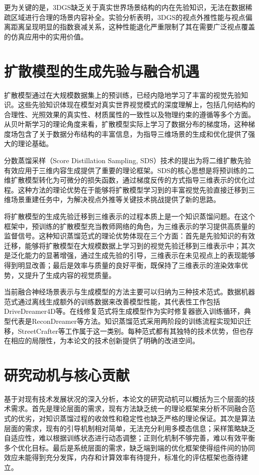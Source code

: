 更为关键的是，3DGS缺乏关于真实世界场景结构的内在先验知识，无法在数据稀疏区域进行合理的场景内容补全。实验分析表明，3DGS的视点外推性能与视点偏离距离呈现明显的指数衰减关系，这种性能退化严重限制了其在需要广泛视点覆盖的仿真应用中的实用价值。

\section{扩散模型的生成先验与融合机遇}

扩散模型通过在大规模数据集上的预训练，已经内隐地学习了丰富的视觉先验知识\cite{ho2020denoising}。这些先验知识体现在模型对真实世界视觉模式的深度理解上，包括几何结构的合理性、光照效果的真实性、材质属性的一致性以及物理约束的遵循等多个方面。从贝叶斯学习的理论角度来看，扩散模型实际上学习了数据分布的梯度场，这种梯度场包含了关于数据分布结构的丰富信息，为指导三维场景的生成和优化提供了强大的理论基础。

分数蒸馏采样（Score Distillation Sampling, SDS）技术的提出为将二维扩散先验有效应用于三维内容生成提供了重要的理论框架\cite{dreamfusion2022}。SDS的核心思想是将预训练的二维扩散模型转化为可微分的损失函数，通过梯度反传的方式指导三维表示的优化过程。这种方法的理论优势在于能够将扩散模型学习到的丰富视觉先验直接迁移到三维场景重建任务中，为解决视点外推等关键技术挑战提供了新的思路。

将扩散模型的生成先验迁移到三维表示的过程本质上是一个知识蒸馏问题。在这个框架中，预训练的扩散模型充当教师网络的角色，为三维表示的学习提供高质量的监督信号。这种知识蒸馏范式的理论优势体现在三个方面：首先是先验知识的有效迁移，能够将扩散模型在大规模数据上学习到的视觉先验迁移到三维表示中；其次是泛化能力的显著增强，通过生成先验的引导，三维表示在未见视点上的表现能够得到明显改善；最后是效率与质量的良好平衡，既保持了三维表示的渲染效率优势，又提升了生成内容的视觉质量。

当前融合神经场景表示与生成模型的方法主要可以归纳为三种技术范式。数据机器范式通过离线生成额外的训练数据来改善模型性能，其代表性工作包括DriveDreamer4D等。在线修复范式将生成模型作为实时修复器嵌入训练循环，典型代表是ReconDreamer等方法。知识蒸馏范式采用两阶段的训练流程实现知识迁移，StreetCrafter等工作属于这一类别。每种范式都有其独特的技术优势，但也存在相应的局限性，为本论文的技术创新提供了明确的改进空间。

\section{研究动机与核心贡献}

基于对现有技术发展状况的深入分析，本论文的研究动机可以概括为三个层面的技术需求。首先是理论层面的需求，现有方法缺乏统一的理论框架来分析不同融合范式的优劣，对知识蒸馏过程的收敛性和稳定性也缺乏严格的理论保证。其次是算法层面的需求，现有的引导机制相对简单，无法充分利用多模态信息；采样策略缺乏自适应性，难以根据训练状态进行动态调整；正则化机制不够完善，难以有效平衡多个优化目标。最后是系统层面的需求，缺乏端到端的优化框架使得组件间的协同效应未能得到充分发挥，内存和计算效率有待提升，标准化的评估框架也亟待建立。

